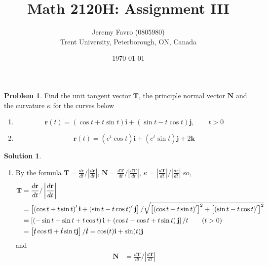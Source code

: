 \documentclass[10pt]{article}
\title{Math 2120H: Assignment III}
\author{Jeremy Favro (0805980) \\ Trent University, Peterborough, ON, Canada}
\date{\today}
\theoremstyle{definition}
\newtheorem{problem}{Problem}
\newtheorem{soln}{Solution}
\newcommand{\ui}{\mathbf{i}}
\newcommand{\uj}{\mathbf{j}}
\newcommand{\uk}{\mathbf{k}}
\begin{document}
\maketitle

\begin{problem}
Find the unit tangent vector $\mathbf{T}$, the principle normal vector $\mathbf{N}$ and the curvature $\kappa$ for the curves below
\begin{enumerate}[label=(\alph*)]
  \item $$\mathbf{r}(t)=\left(\cos{t}+t\sin{t}\right)\ui+\left(\sin{t}-t\cos{t}\right)\uj,\qquad t>0$$
  \item $$\mathbf{r}(t)=\left(e^t\cos{t}\right)\ui+\left(e^t\sin{t}\right)\uj+2\uk$$
\end{enumerate}
\end{problem}
\begin{soln}~
  \begin{enumerate}[label=(\alph*)]
    \item By the formula $\mathbf{T}=\frac{d\mathbf{r}}{dt}/\left|\frac{d\mathbf{r}}{dt}\right|$, $\mathbf{N}=\frac{d\mathbf{T}}{dt}/\left|\frac{d\mathbf{T}}{dt}\right|$,
          $\kappa=\left|\frac{d\mathbf{T}}{dt}\right|/\left|\frac{d\mathbf{r}}{dt}\right|$ so,
          \begin{align*}
            \mathbf{T} & =\frac{d\mathbf{r}}{dt}/\left|\frac{d\mathbf{r}}{dt}\right|                                                                                                                                                   \\
                       & = \left[\left(\cos{t}+t\sin{t}\right)^\prime\ui+\left(\sin{t}-t\cos{t}\right)^\prime\uj\right]/\sqrt{\left[\left(\cos{t}+t\sin{t}\right)^\prime\right]^2+\left[\left(\sin{t}-t\cos{t}\right)^\prime\right]^2} \\
                       & = \left[\left(-\sin t+\sin t +t\cos t\right)\ui+\left(\cos t -\cos t +t\sin t\right)\uj\right]/t\qquad(t>0)                                                                                                   \\
                       & = \left[\cancel{t}\cos t\ui+\cancel{t}\sin t\uj\right]/\cancel{t}=\cos (t)\ui+\sin (t)\uj
          \end{align*}
          and
          \begin{align*}
            \mathbf{N} & =\frac{d\mathbf{T}}{dt}/\left|\frac{d\mathbf{T}}{dt}\right|                                  \\

\end{align*}
\end{enumerate}
\end{soln}
\end{document}
